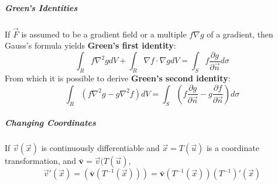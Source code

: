 \documentclass[11pt]{article}
\begin{document}
	\subparagraph{Green's Identities} If $\vec{F}$ is assumed to be a gradient field or a multiple $f\nabla g$ of a gradient, then Gauss's formula yields \textbf{Green's first identity}:
		\begin{equation}
			\int_R f\nabla^2 gdV + \int_R \nabla f \cdot \nabla g dV = \int_S f \frac{\partial g}{\partial \vec{n}} d\sigma
		\end{equation}
		From which it is possible to derive \textbf{Green's second identity}:
		\begin{equation}
			\int_R (f\nabla^2 g - g\nabla^2 f)dV = \int_S \left(f \frac{\partial g}{\partial \vec{n}} - g \frac{\partial f}{\partial \vec{n}} \right)d\sigma
		\end{equation}
		
	\subparagraph{Changing Coordinates} If $\vec{v}(\vec{x})$ is continuously differentiable and $\vec{x} = T(\vec{u})$ is a coordinate transformation, and $\bar{\mathbf{v}} = \vec{v}(T(\vec{u})$,
		\begin{equation}
			\vec{v}'(\vec{x}) = (\bar{\mathbf{v}} (T^{-1}(\vec{x}))) = \bar{\mathbf{v}}(T^{-1}(\vec{x}))(T^{-1})'(\vec{x})
		\end{equation}
%		
%		


\end{document}
